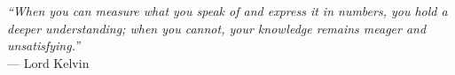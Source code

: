 \begin{flushright}
\emph{``When you can measure what you speak of and express it in numbers, you hold a deeper understanding; when you cannot, your knowledge remains meager and unsatisfying.''}\\
--- Lord Kelvin
\end{flushright}